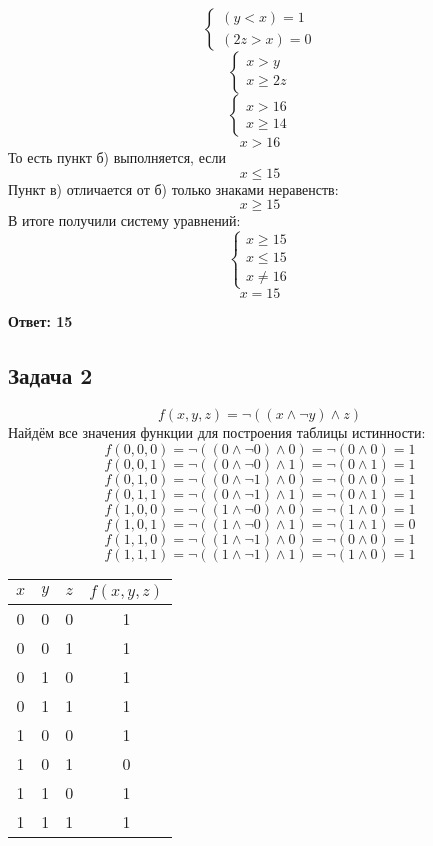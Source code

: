 \documentclass[a4paper,12pt]{article} %
\begin{document}
\[\begin{cases}
  (y < x) = 1\\
  (2z>x)=0
\end{cases}\] 
\[\begin{cases}
  x>y\\
  x\geqslant 2z
\end{cases}\]
 \[\begin{cases}
  x>16\\
  x\geqslant 14
\end{cases}\]
\[ x>16\]
То есть пункт б) выполняется, если
\[ x\leqslant15\]
Пункт в) отличается от б) только знаками неравенств:
\[ x\geqslant15\]
В итоге получили систему уравнений:
\[\begin{cases}
  x\geqslant15\\
  x\leqslant15\\
  x \neq 16
\end{cases}\]
\[x = 15\]
\begin{flushright}
\begin{large}
\textbf {Ответ: 15}
\end{large}
\end{flushright}
\newpage
\begin{center}
\section*{Задача 2}
\end{center}
\[f(x,y,z)=\neg{((x \wedge \neg y)\wedge z)}\]
Найдём все значения функции для построения таблицы истинности:
\[f(0,0,0)=\neg{((0 \wedge \neg 0)\wedge 0)}=\neg{(0\wedge 0)}=1\]
\[f(0,0,1)=\neg{((0 \wedge \neg 0)\wedge 1)}=\neg{(0\wedge 1)}=1\]
\[f(0,1,0)=\neg{((0 \wedge \neg 1)\wedge 0)}=\neg{(0\wedge 0)}=1\]
\[f(0,1,1)=\neg{((0 \wedge \neg 1)\wedge 1)}=\neg{(0\wedge 1)}=1\]
\[f(1,0,0)=\neg{((1 \wedge \neg 0)\wedge 0)}=\neg{(1\wedge 0)}=1\]
\[f(1,0,1)=\neg{((1 \wedge \neg 0)\wedge 1)}=\neg{(1\wedge 1)}=0\]
\[f(1,1,0)=\neg{((1 \wedge \neg 1)\wedge 0)}=\neg{(0\wedge 0)}=1\]
\[f(1,1,1)=\neg{((1 \wedge \neg 1)\wedge 1)}=\neg{(1\wedge 0)}=1\]
\begin{center}
\begin{tabular}{|c|c|c|c|}
\hline
$x$ & $y$ & $z$ & $f(x,y,z)$ \\
\hline
0 & 0 & 0 & 1 \\
\hline
0 & 0 & 1 & 1 \\
\hline
0 & 1 & 0 & 1 \\
\hline
0 & 1 & 1 & 1 \\
\hline
1 & 0 & 0 & 1 \\
\hline
1 & 0 & 1 & 0 \\
\hline
1 & 1 & 0 & 1 \\
\hline
1 & 1 & 1 & 1 \\
\hline
\end{tabular}
\end{center}
\end{document}
